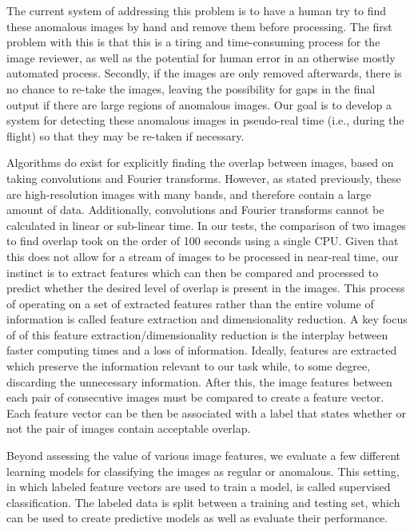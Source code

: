 The current system of addressing this problem is to have a human try to find these anomalous images by hand and remove them before processing.
The first problem with this is that this is a tiring and time-consuming process for the image reviewer, as well as the potential for human error in an otherwise mostly automated process.
Secondly, if the images are only removed afterwards, there is no chance to re-take the images, leaving the possibility for gaps in the final output if there are large regions of anomalous images.
Our goal is to develop a system for detecting these anomalous images in pseudo-real time (i.e., during the flight) so that they may be re-taken if necessary.

Algorithms do exist for explicitly finding the overlap between images, based on taking convolutions and Fourier transforms.
However, as stated previously, these are high-resolution images with many bands, and therefore contain a large amount of data.
Additionally, convolutions and Fourier transforms cannot be calculated in linear or sub-linear time.
In our tests, the comparison of two images to find overlap took on the order of 100 seconds using a single CPU.
Given that this does not allow for a stream of images to be processed in near-real time, our instinct is to extract features which can then be compared and processed to predict whether the desired level of overlap is present in the images.
This process of operating on a set of extracted features rather than the entire volume of information is called feature extraction and dimensionality reduction.
A key focus of of this feature extraction/dimensionality reduction is the interplay between faster computing times and a loss of information.
Ideally, features are extracted which preserve the information relevant to our task while, to some degree, discarding the unnecessary information.
After this, the image features between each pair of consecutive images must be compared to create a feature vector.
Each feature vector can be then be associated with a label that states whether or not the pair of images contain acceptable overlap.


Beyond assessing the value of various image features, we evaluate a few different learning models for classifying the images as regular or anomalous.
This setting, in which labeled feature vectors are used to train a model, is called supervised classification.
The labeled data is split between a training and testing set, which can be used to create predictive models as well as evaluate their performance.


